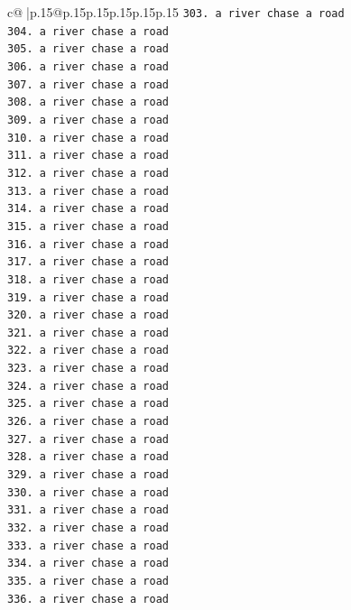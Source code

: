 \documentclass{article}
\begin{document}
{\begin{supertabular}{c@{$\;$}|p{.15\linewidth}@{}p{.15\linewidth}p{.15\linewidth}p{.15\linewidth}p{.15\linewidth}p{.15\linewidth}}
{{{\texttt{303. a river chase a road} \\
\texttt{304. a river chase a road} \\
\texttt{305. a river chase a road} \\
\texttt{306. a river chase a road} \\
\texttt{307. a river chase a road} \\
\texttt{308. a river chase a road} \\
\texttt{309. a river chase a road} \\
\texttt{310. a river chase a road} \\
\texttt{311. a river chase a road} \\
\texttt{312. a river chase a road} \\
\texttt{313. a river chase a road} \\
\texttt{314. a river chase a road} \\
\texttt{315. a river chase a road} \\
\texttt{316. a river chase a road} \\
\texttt{317. a river chase a road} \\
\texttt{318. a river chase a road} \\
\texttt{319. a river chase a road} \\
\texttt{320. a river chase a road} \\
\texttt{321. a river chase a road} \\
\texttt{322. a river chase a road} \\
\texttt{323. a river chase a road} \\
\texttt{324. a river chase a road} \\
\texttt{325. a river chase a road} \\
\texttt{326. a river chase a road} \\
\texttt{327. a river chase a road} \\
\texttt{328. a river chase a road} \\
\texttt{329. a river chase a road} \\
\texttt{330. a river chase a road} \\
\texttt{331. a river chase a road} \\
\texttt{332. a river chase a road} \\
\texttt{333. a river chase a road} \\
\texttt{334. a river chase a road} \\
\texttt{335. a river chase a road} \\
\texttt{336. a river chase a road} \\
}}}
\end{supertabular}}
\end{document}
